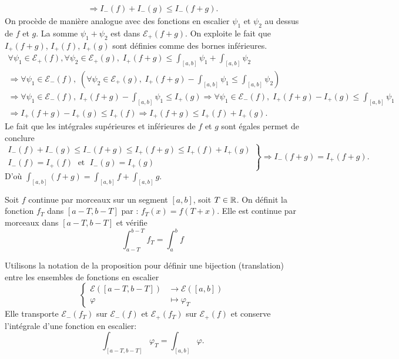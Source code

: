 \begin{demo}
\begin{multline*}
\Rightarrow I_-(f) + I_-(g) \leq I_-\left( f+g\right) .
\end{multline*}
On procède de manière analogue avec des fonctions en escalier $\psi_1$ et $\psi_2$ au dessus de $f$ et $g$. La somme $\psi_1+\psi_2$ est dans $\mathcal E_+(f+g)$. On exploite le fait que $I_+(f+g)$, $I_+(f)$, $I_+(g)$ sont définies comme des bornes inférieures.
\begin{multline*}
 \forall \psi_1 \in \mathcal E_+(f), \forall \psi_2 \in \mathcal E_+(g) ,\; I_+\left( f+g\right) \leq \int_{[a,b]}\psi_1+\int_{[a,b]}\psi_2 \\ 
\Rightarrow \forall \psi_1 \in \mathcal E_-(f),\; \left(\forall \psi_2 \in \mathcal E_+(g),\;  I_+\left( f+g\right) - \int_{[a,b]}\psi_1\leq \int_{[a,b]}\psi_2\right) \\
\Rightarrow \forall \psi_1 \in \mathcal E_-(f),\;  I_+\left( f+g\right) - \int_{[a,b]}\psi_1\leq I_+(g) 
\Rightarrow \forall \psi_1 \in \mathcal E_-(f),\;  I_+\left( f+g\right) - I_+(g)\leq \int_{[a,b]}\psi_1 \\
\Rightarrow I_+\left( f+g\right) - I_+(g)\leq I_+(f) 
\Rightarrow I_+\left( f+g\right) \leq I_+(f) + I_+(g).
\end{multline*}
Le fait que les intégrales supérieures et inférieures de $f$ et $g$ sont égales permet de conclure
\[
 \left. 
 \begin{aligned}
  I_-(f) + I_-(g) \leq I_-\left( f+g\right) \leq I_+\left( f+g\right) \leq I_+(f) + I_+(g)\\
  I_-(f) = I_+(f) \; \text{ et } \;  I_-(g) = I_+(g)
 \end{aligned}
\right\rbrace \Rightarrow
I_-\left( f+g\right) = I_+\left( f+g\right).
\]
D'où $\int_{[a,b]}\left( f + g\right) = \int_{[a,b]}f + \int_{[a,b]}g$.
\end{demo}
\begin{propn}
Soit $f$ continue par morceaux sur un segment $[a,b]$, soit $T\in \mathbb{R}$. On définit la fonction $f_T$ dans $[a-T,b-T]$ par : $f_T(x)=f(T+x)$. Elle est continue par morceaux dans $[a-T,b-T]$ et vérifie
\begin{displaymath}
 \int_{a-T}^{b-T}f_T = \int_a^bf
\end{displaymath} 
\end{propn}
\begin{demo}
 Utilisons la notation de la proposition pour définir une bijection (translation) entre les ensembles de fonctions en escalier
\[
 \left\lbrace 
 \begin{aligned}
  \mathcal{E}([a-T,b-T]) &\rightarrow \mathcal{E}([a,b]) \\
  \varphi &\mapsto \varphi_T
 \end{aligned}
\right. 
\]
Elle transporte $\mathcal{E}_-(f_T)$ sur $\mathcal{E}_-(f)$ et $\mathcal{E}_+(f_T)$ sur $\mathcal{E}_+(f)$ et conserve l'intégrale d'une fonction en escalier: 
\[
 \int_{[a-T,b-T]}\varphi_T = \int_{[a,b]}\varphi .
\]  
\end{demo}
